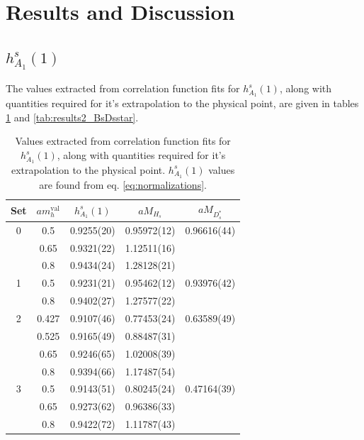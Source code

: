 \section{Results and Discussion}
\label{sec:results}

\subsection{$h^s_{A_1}(1)$}

The values extracted from correlation function fits for $h^s_{A_1}(1)$, along with quantities required for it's extrapolation to the physical point, are given in tables \ref{tab:results_BsDsstar} and \ref{tab:results2_BsDsstar}.

\begin{table}
\begin{center}
\begin{tabular}{ c c c c c }
\hline
Set & $am_h^{\text{val}}$ & $h^s_{A_1}(1)$& $aM_{H_s}$& $aM_{D^*_s}$\\ [0.5ex]
\hline
0 & 0.5 & 0.9255(20) & 0.95972(12) & 0.96616(44)\\ [0.5ex] 
 & 0.65 & 0.9321(22) & 1.12511(16) & \\ [0.5ex] 
 & 0.8 & 0.9434(24) & 1.28128(21) & \\ [0.5ex] 
\hline
1 & 0.5 & 0.9231(21) & 0.95462(12) & 0.93976(42)\\ [0.5ex] 
 & 0.8 & 0.9402(27) & 1.27577(22) & \\ [0.5ex] 
\hline
2 & 0.427 & 0.9107(46) & 0.77453(24) & 0.63589(49)\\ [0.5ex] 
 & 0.525 & 0.9165(49) & 0.88487(31) & \\ [0.5ex] 
 & 0.65 & 0.9246(65) & 1.02008(39) & \\ [0.5ex] 
 & 0.8 & 0.9394(66) & 1.17487(54) & \\ [0.5ex] 
\hline
3 & 0.5 & 0.9143(51) & 0.80245(24) & 0.47164(39)\\ [0.5ex] 
 & 0.65 & 0.9273(62) & 0.96386(33) & \\ [0.5ex] 
 & 0.8 & 0.9422(72) & 1.11787(43) & \\ [0.5ex] 
\hline
\end{tabular}
\caption{Values extracted from correlation function fits for $h^s_{A_1}(1)$, along with quantities required for it's extrapolation to the physical point. $h^s_{A_1}(1)$ values are found from eq. \eqref{eq:normalizations}. \label{tab:results_BsDsstar}}
\end{center}
\end{table}

